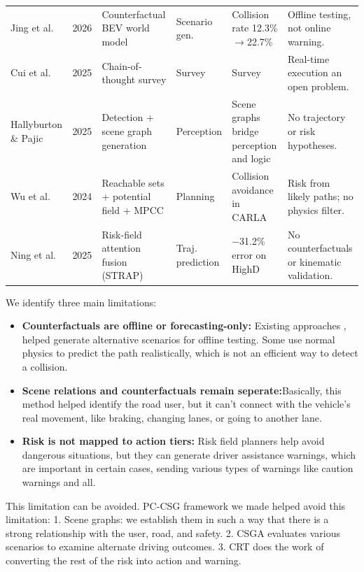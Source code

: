 \documentclass[preprint,12pt]{elsarticle}
\begin{document}
\begin{table}[H]
{\begin{tabular}{l c L{4.0cm} l L{4.0cm} L{5.0cm}}
Jing et al. \cite{jing2026counterscene} & 2026 & Counterfactual BEV world model & Scenario gen. & Collision rate 12.3\%$\rightarrow$22.7\% & Offline testing, not online warning. \\
Cui et al. \cite{cui2025cot} & 2025 & Chain-of-thought survey & Survey & Survey & Real-time execution an open problem. \\
Hallyburton \& Pajic \cite{hallyburton2025neuspaper} & 2025 & Detection + scene graph generation & Perception & Scene graphs bridge perception and logic & No trajectory or risk hypotheses. \\
Wu et al. \cite{wu2024riskfield} & 2024 & Reachable sets + potential field + MPCC & Planning & Collision avoidance in CARLA & Risk from likely paths; no physics filter. \\
Ning et al. \cite{ning2025strap} & 2025 & Risk-field attention fusion (STRAP) & Traj. prediction & $-$31.2\% error on HighD & No counterfactuals or kinematic validation. \\
\hline
\end{tabular}
}
\end{table}

We identify three main limitations:
\begin{itemize}
    \item \textbf{Counterfactuals are offline or forecasting-only:} Existing approaches \cite{jing2026counterscene}, \cite{han2025cicr} helped generate alternative scenarios for offline testing. Some \cite{liao2024physics, baden2025tpk, chugh2025xtrack} use normal physics to predict the path realistically, which is not an efficient way to detect a collision.
    \item \textbf{Scene relations and counterfactuals remain seperate:}Basically, this method  \cite{ahmadi2025critic} helped identify the road user, but it can't connect with the vehicle's real movement, like braking, changing lanes, or going to another lane.
    \item \textbf{Risk is not mapped to action tiers:} Risk field planners \cite{wu2024riskfield, ning2025strap} help avoid dangerous situations, but they can generate driver assistance warnings, which are important in certain cases, sending various types of warnings like caution warnings and all.
\end{itemize}

This limitation can be avoided. PC-CSG framework we made helped avoid this limitation:
1. Scene graphs: we establish them in such a way that there is a strong relationship with the user, road, and safety.
2. CSGA evaluates various scenarios to examine alternate driving outcomes.
3. CRT does the work of converting the rest of the risk into action and warning.
\end{document}
